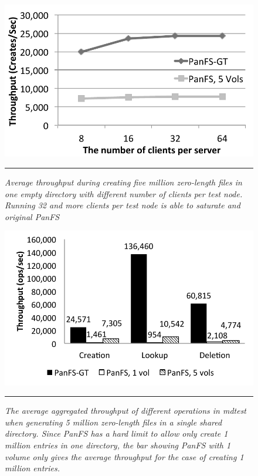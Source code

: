 \begin{figure}[t]  %
\centerline{\includegraphics[scale=0.7]{./figs/zero_file_creation_on_panfs}}
\vspace{10pt}
\caption{\footnotesize
\textit{Average throughput during creating five million zero-length files
in one empty directory with different number of clients per test node.
Running 32 and more clients per test node is able to saturate \psys
and original PanFS}
}
\hrule
\label{graph:creation_clients}
\end{figure}       %

\begin{figure}[t]  %
\centerline{\includegraphics[scale=0.7]{./figs/mdtest}}
\vspace{10pt}
\caption{\footnotesize
\textit{
The average aggregated throughput of different operations in {\it mdtest}
when generating 5 million zero-length files in a single shared directory.
Since PanFS has a hard limit to allow only create 1 million entries
in one directory, the bar showing PanFS with 1 volume only gives
the average throughput for the case of creating 1 million entries.
}
}
\hrule
\label{graph:mdtest_ops}
\end{figure}       %


